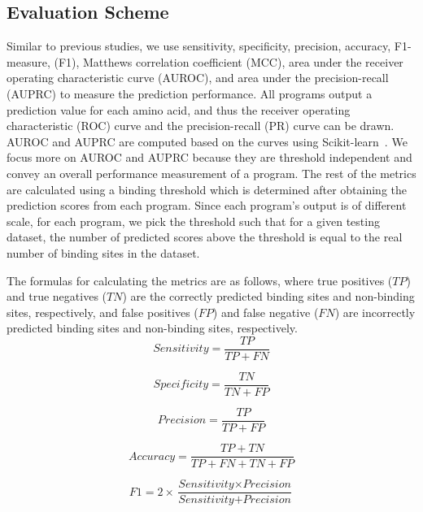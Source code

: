 \subsection{Evaluation Scheme \label{sec_evaluation_scheme}}
Similar to previous studies, we use sensitivity, specificity, precision, accuracy, F1-measure, (F1), Matthews correlation coefficient (MCC), area under the receiver operating characteristic curve (AUROC), and area under the precision-recall (AUPRC) to measure the prediction performance. All programs output a prediction value for each amino acid, and thus the receiver operating characteristic (ROC) curve and the precision-recall (PR) curve can be drawn. AUROC and AUPRC are computed based on the curves using Scikit-learn~\cite{scikit-learn}. We focus more on AUROC and AUPRC because they are threshold independent and convey an overall performance measurement of a program. The rest of the metrics are calculated using a binding threshold which is determined after obtaining the prediction scores from each program. Since each program's output is of different scale, for each program, we pick the threshold such that for a given testing dataset, the number of predicted scores above the threshold is equal to the real number of binding sites in the dataset. 

The formulas for calculating the metrics are as follows, where true positives ($TP$) and true negatives ($TN$) are the correctly predicted binding sites and non-binding sites, respectively, and false positives ($FP$) and false negative ($FN$) are incorrectly predicted binding sites and non-binding sites, respectively.
\begin{equation}
\textit{Sensitivity} = \frac{TP}{TP+FN}
\end{equation}

\begin{equation}
\textit{Specificity} = \frac{TN}{TN+FP}
\end{equation}

\begin{equation}
\textit{Precision} = \frac{TP}{TP + FP} 
\end{equation}

\begin{equation}
\textit{Accuracy}=\frac{TP+TN}{TP+FN+TN+FP}
\end{equation}

\begin{equation}
F1=2\times \frac{\textit{Sensitivity}\times \textit{Precision}}{\textit{Sensitivity}+\textit{Precision}}
\end{equation}


